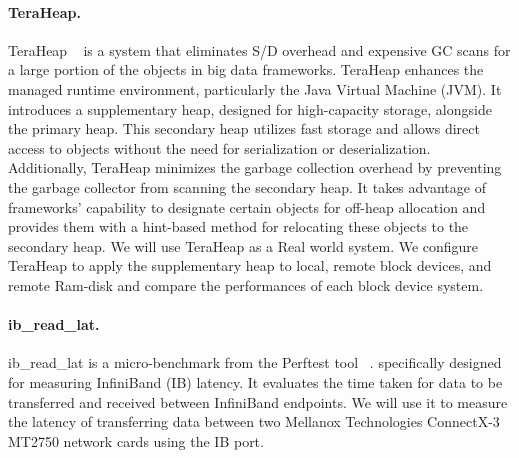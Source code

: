 \paragraph{TeraHeap.} TeraHeap ~\cite{teraheap} is a system that eliminates S/D overhead and expensive GC scans for a
large portion of the objects in big data frameworks. TeraHeap enhances the
managed runtime environment, particularly the Java Virtual Machine (JVM). It
introduces a supplementary heap, designed for high-capacity storage, alongside
the primary heap. This secondary heap utilizes fast storage and allows direct
access to objects without the need for serialization or deserialization.
Additionally, TeraHeap minimizes the garbage collection overhead by preventing
the garbage collector from scanning the secondary heap. It takes advantage of
frameworks' capability to designate certain objects for off-heap allocation and
provides them with a hint-based method for relocating these objects to the
secondary heap. We will use TeraHeap as a Real world system. We configure TeraHeap to apply the supplementary heap to local, remote block devices, and remote Ram-disk and compare the performances of each block device system.

\paragraph{ib\_read\_lat.} ib\_read\_lat is a micro-benchmark from the Perftest tool ~\cite{perftest}. specifically designed for measuring InfiniBand (IB) latency. It evaluates the time taken for data to be transferred and received between InfiniBand endpoints. We will use it to measure the latency of transferring data between two Mellanox Technologies ConnectX-3 MT2750 network cards using the IB port.

